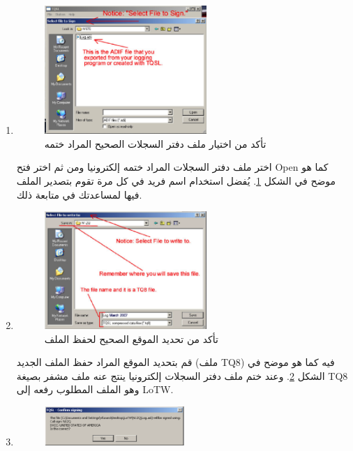 \documentclass[a4paper,12pt]{article}
\begin{document}
\begin{enumerate}
		\item
			\begin{figure}[!hbtp]
			\centering
			\includegraphics[width=0.58\textwidth]{signselectfiletosign.eps}
			\caption{تأكد من اختيار ملف دفتر السجلات الصحيح المراد ختمه}
			\label{fig:SignFileToSign}
			\end{figure}
		  اختر ملف دفتر السجلات المراد ختمه إلكترونيا ومن ثم اختر فتح \textenglish{Open} كما هو موضح في الشكل \ref{fig:SignFileToSign}. يُفضل
		  استخدام اسم فريد في كل مرة تقوم بتصدير الملف فيها لمساعدتك في متابعة
		  ذلك.
\clearpage
		\item
			\begin{figure}[!hbtp]
			\centering
			\includegraphics[width=0.58\textwidth]{signselectfiletowrite.eps}
			\caption{تأكد من تحديد الموقع الصحيح لحفظ الملف}
			\label{fig:SignFileToWrite}
			\end{figure}
		  قم بتحديد الموقع المراد حفظ الملف الجديد (ملف \textenglish{TQ8}) فيه كما هو موضح في الشكل \ref{fig:SignFileToWrite}. وعند ختم ملف
		  دفتر السجلات إلكترونيا ينتج عنه ملف مشفر بصيغة \textenglish{TQ8} وهو الملف المطلوب
		  رفعه إلى \textenglish{LoTW}.
		\item
			\begin{figure}[!hbtp]
			\centering
			\includegraphics[width=0.5\textwidth]{signconfirmation.eps}

\end{figure}
\end{enumerate}
\end{document}
